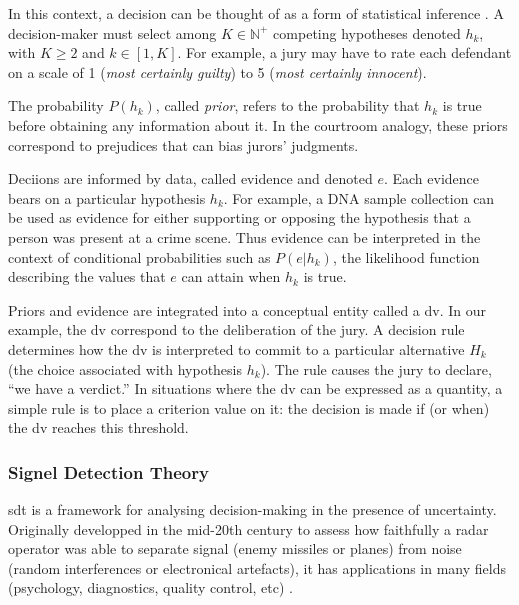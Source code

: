 In this context, a decision can be thought of as a form of statistical inference \cite{goldNeuralBasisDecision2007}. A decision-maker must select among $K \in \mathbb{N^{+}}$ competing hypotheses denoted $h_k$, with $K \ge 2$ and $k \in [1,K]$. For example, a jury may have to rate each defendant on a scale of 1 (\textit{most certainly guilty}) to 5 (\textit{most certainly innocent}).

The probability $P(h_k)$, called \textit{prior}, refers to the probability that $h_k$ is true before obtaining any information about it. In the courtroom analogy, these priors correspond to prejudices that can bias jurors’ judgments.

Deciions are informed by data, called evidence and denoted $e$. Each evidence bears on a particular hypothesis $h_k$. For example, a DNA sample collection can be used as evidence for either supporting or opposing the hypothesis that a person was present at a crime scene. Thus evidence can be interpreted in the context of conditional probabilities such as $P(e|h_k)$, the likelihood function describing the values that $e$ can attain when $h_k$ is true.

Priors and evidence  are integrated into a conceptual entity called a \acrfull{dv}. In our example, the \acrshort{dv} correspond to the deliberation of the jury. A decision rule determines how the \acrshort{dv} is interpreted to commit to a particular alternative $H_k$ (the choice associated with hypothesis $h_k$). The rule causes the jury to declare, “we have a verdict.” In situations where the \acrshort{dv} can be expressed as a quantity, a simple rule is to place a criterion value on it: the decision is made if (or when) the \acrshort{dv} reaches this threshold.


\subsubsection{Signel Detection Theory}

\acrfull{sdt} is a framework for analysing \gls{decision-making} in the presence of  \gls{uncertainty}. Originally developped in the mid-20th century to assess how faithfully a radar operator was able to separate signal (enemy missiles or planes) from noise (random interferences or electronical artefacts), it has applications in many fields (psychology, diagnostics, quality control, etc) \cite{green1966signal}.

